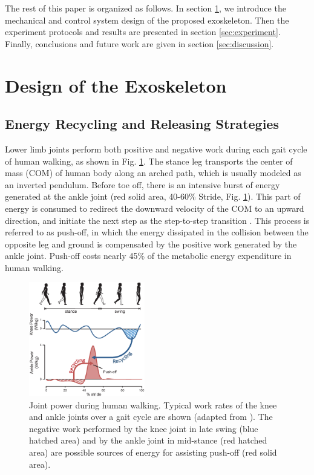 \documentclass[twocolumn,cleanfoot,10pt]{asme2ej}
\begin{document}
The rest of this paper is organized as follows.
In section \ref{sec:design}, we introduce the mechanical and control system design of the proposed exoskeleton.
Then the experiment protocols and results are presented in section \ref{sec:experiment}.
Finally, conclusions and future work are given in section \ref{sec:discussion}.


\section{Design of the Exoskeleton}
\label{sec:design}

\subsection{Energy Recycling and Releasing Strategies}
\label{subsec:Biomechanics}

Lower limb joints perform both positive and negative work during each gait cycle of human walking, as shown in Fig. \ref{fig:work}.
The stance leg transports the center of mass (COM) of human body along an arched path, which is usually modeled as an inverted pendulum\cite{RN13}.
Before toe off, there is an intensive burst of energy generated at the ankle joint (red solid area, 40-60\% Stride, Fig. \ref{fig:work}).
This part of energy is consumed to redirect the downward velocity of the COM to an upward direction, and initiate the next step as the step-to-step transition \cite{RN14}.
This process is referred to as push-off, in which the energy dissipated in the collision between the opposite leg and ground is compensated by the positive work generated by the ankle joint.
Push-off costs nearly 45\% of the metabolic energy expenditure in human walking\cite{RN15}.

\begin{figure}[b]
	\centering
	\includegraphics[width=0.45\textwidth]{Figure1.eps}
	\caption{Joint power during human walking.
	Typical work rates of the knee and ankle joints over a gait cycle are shown (adapted from \cite{RN2}).
	The negative work performed by the knee joint in late swing (blue hatched area) and by the ankle joint in mid-stance (red hatched area) are possible sources of energy for assisting push-off (red solid area).}
	\label{fig:work}
\end{figure}
\end{document}
